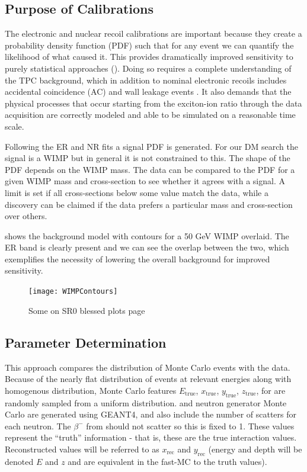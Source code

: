 \subsection{Purpose of Calibrations}
\label{subsec:er_nr_calibrations_purpose}
The electronic and nuclear recoil calibrations are important because they create a probability density function (PDF)
such that for any event we can quantify the likelihood of what caused it.  This provides dramatically improved sensitivity
to purely statistical approaches ().  Doing so requires a complete understanding of the TPC background, which
in addition to nominal electronic recoils includes accidental coincidence (AC) and wall leakage events
.  It also demands that
the physical processes that occur starting from the exciton-ion ratio through the data acquisition are correctly modeled and able to be
simulated on a reasonable time scale.

Following the ER and NR fits a signal PDF is generated.  For our DM search the
signal is a WIMP but in general it is not constrained to this.  The shape of the PDF depends on the WIMP mass.  The data can be compared
to the PDF for a given WIMP mass and cross-section to see whether it agrees with a signal.  A limit is set if all cross-sections below
some value match the data, while a discovery can be claimed if the data prefers a particular mass and cross-section over others.

 shows the background model with contours for a 50 GeV WIMP overlaid.  The ER band is clearly
present and we can see the overlap between the two, which exemplifies the necessity of lowering the overall background for improved
sensitivity.

\begin{figure}
\centering
\texttt{[image: WIMPContours]}
\caption{Some on SR0 blessed plots page}
\label{fig:er_nr_calibrations_wimp_contours}
\end{figure}



\subsection{Parameter Determination}
\label{subsec:er_nr_calibrations_parameter_determ}
This approach compares the distribution of Monte Carlo events with the data.  Because of the nearly flat distribution of events at relevant
energies along with homogenous distribution, Monte Carlo features $E_{\mathrm{true}}$, $x_{\mathrm{true}}$, $y_{\mathrm{true}}$,
$z_{\mathrm{true}}$, for  are randomly sampled from a
uniform distribution.   and neutron generator Monte Carlo are generated using GEANT4, and also include the number of
scatters for each neutron.  The $\beta^-$ from  should not scatter so this is fixed to 1.  These values represent the ``truth''
information - that is, these are the true interaction values.  Reconstructed values will be referred to as $x_{\mathrm{rec}}$ and
$y_{\mathrm{rec}}$ (energy and depth will be denoted $E$ and $z$ and are equivalent in the fast-MC to the truth values).

